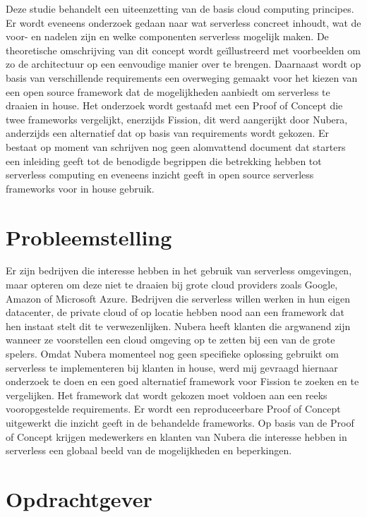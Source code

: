 Deze studie behandelt een uiteenzetting van de basis cloud computing principes. Er wordt eveneens onderzoek gedaan naar wat serverless concreet inhoudt, wat de voor- en nadelen zijn en welke componenten serverless mogelijk maken. De theoretische omschrijving van dit concept wordt geïllustreerd met voorbeelden om zo de architectuur op een eenvoudige manier over te brengen. Daarnaast wordt op basis van verschillende requirements een overweging gemaakt voor het kiezen van een open source framework dat de mogelijkheden aanbiedt om serverless te draaien in house. Het onderzoek wordt gestaafd met een Proof of Concept die twee frameworks vergelijkt, enerzijds Fission, dit werd aangerijkt door Nubera, anderzijds een alternatief dat op basis van requirements wordt gekozen. Er bestaat op moment van schrijven nog geen alomvattend document dat starters een inleiding geeft tot de benodigde begrippen die betrekking hebben tot serverless computing en eveneens inzicht geeft in open source serverless frameworks voor in house gebruik.

\section{Probleemstelling}
\label{sec:probleemstelling}

Er zijn bedrijven die interesse hebben in het gebruik van serverless omgevingen, maar opteren om deze niet te draaien bij grote cloud providers zoals Google, Amazon of Microsoft Azure. Bedrijven die serverless willen werken in hun eigen datacenter, de private cloud of op locatie hebben nood aan een framework dat hen instaat stelt dit te verwezenlijken. Nubera heeft klanten die argwanend zijn wanneer ze voorstellen een cloud omgeving op te zetten bij een van de grote spelers. Omdat Nubera momenteel nog geen specifieke oplossing gebruikt om serverless te implementeren bij klanten in house, werd mij gevraagd hiernaar onderzoek te doen en een goed alternatief framework voor Fission te zoeken en te vergelijken. Het framework dat wordt gekozen moet voldoen aan een reeks vooropgestelde requirements. Er wordt een reproduceerbare Proof of Concept uitgewerkt die inzicht geeft in de behandelde frameworks. Op basis van de Proof of Concept krijgen medewerkers en klanten van Nubera die interesse hebben in serverless een globaal beeld van de mogelijkheden en beperkingen.

\section{Opdrachtgever}
\label{sec:opdrachtgever}


